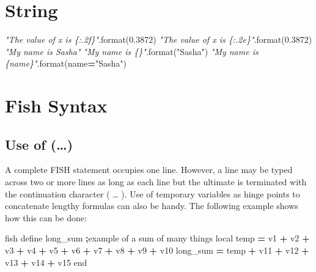 \documentclass[a4paper, nobind]{templates/ociamthesis}
\newenvironment{Shaded}{\begin{snugshade}}{\end{snugshade}}
\newcommand{\BuiltInTok}[1]{#1}
\newcommand{\CommentTok}[1]{\textcolor[rgb]{0.56,0.35,0.01}{\textit{#1}}}
\newcommand{\FloatTok}[1]{\textcolor[rgb]{0.00,0.00,0.81}{#1}}
\newcommand{\NormalTok}[1]{#1}
\newcommand{\OperatorTok}[1]{\textcolor[rgb]{0.81,0.36,0.00}{\textbf{#1}}}
\newcommand{\StringTok}[1]{\textcolor[rgb]{0.31,0.60,0.02}{#1}}
\renewenvironment{Shaded}
{
  \vspace{10pt}%
  \begin{snugshade}%
}{%
  \end{snugshade}%
  \vspace{8pt}%
}
\begin{document}
\hypertarget{string}{%
\section{String}\label{string}}

\begin{Shaded}
\begin{Highlighting}[]
\CommentTok{"The value of x is \{:.2f\}"}\NormalTok{.}\BuiltInTok{format}\NormalTok{(}\FloatTok{0.3872}\NormalTok{)}
\CommentTok{"The value of x is \{:.2e\}"}\NormalTok{.}\BuiltInTok{format}\NormalTok{(}\FloatTok{0.3872}\NormalTok{)}
\CommentTok{"My name is Sasha"}
\CommentTok{"My name is \{\}"}\NormalTok{.}\BuiltInTok{format}\NormalTok{(}\StringTok{"Sasha"}\NormalTok{)}
\CommentTok{"My name is \{name\}"}\NormalTok{.}\BuiltInTok{format}\NormalTok{(name}\OperatorTok{=}\StringTok{"Sasha"}\NormalTok{)}
\end{Highlighting}
\end{Shaded}

\hypertarget{fish-syntax}{%
\section{Fish Syntax}\label{fish-syntax}}

\hypertarget{use-of}{%
\subsection{Use of (\ldots)}\label{use-of}}

A complete FISH statement occupies one line. However, a line may be
typed across two or more lines as long as each line but the ultimate is
terminated with the continuation character ( \ldots{} ). Use of temporary
variables as hinge points to concatenate lengthy formulas can also be
handy. The following example shows how this can be done:

\begin{Shaded}
\begin{Highlighting}[]
\NormalTok{fish define long\_sum  }\OperatorTok{;}\NormalTok{example of a }\BuiltInTok{sum}\NormalTok{ of many things}
\NormalTok{    local temp }\OperatorTok{=}\NormalTok{ v1 }\OperatorTok{+}\NormalTok{ v2 }\OperatorTok{+}\NormalTok{ v3 }\OperatorTok{+}\NormalTok{ v4 }\OperatorTok{+}\NormalTok{ v5 }\OperatorTok{+}\NormalTok{ v6 }\OperatorTok{+}\NormalTok{ v7 }\OperatorTok{+}\NormalTok{ v8 }\OperatorTok{+}\NormalTok{ v9 }\OperatorTok{+}\NormalTok{ v10}
\NormalTok{    long\_sum }\OperatorTok{=}\NormalTok{ temp }\OperatorTok{+}\NormalTok{ v11 }\OperatorTok{+}\NormalTok{ v12 }\OperatorTok{+}\NormalTok{ v13 }\OperatorTok{+}\NormalTok{ v14 }\OperatorTok{+}\NormalTok{ v15}
\NormalTok{end}
\end{Highlighting}
\end{Shaded}
\end{document}
